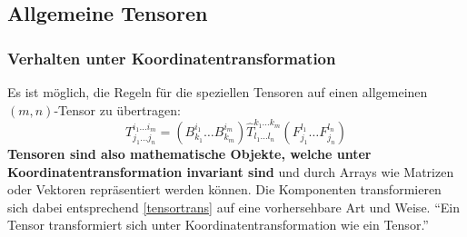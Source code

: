 	\subsection{Allgemeine Tensoren}
	\subsubsection{Verhalten unter Koordinatentransformation}
	Es ist möglich, die Regeln für die speziellen Tensoren auf einen allgemeinen $(m,n)$-Tensor zu übertragen:
	\begin{equation}\label{tensortrans}
		T^{i_1\dots i_m}_{j_1\dots j_n}=(B^{i_1}_{k_1}\dots B^{i_m}_{k_m})\hat{T}^{k_1\dots k_m}_{l_1\dots l_n}(F^{l_1}_{j_1}\dots F^{l_n}_{j_n})
	\end{equation}
	\textbf{Tensoren sind also mathematische Objekte, welche unter Koordinatentransformation invariant sind} und durch Arrays wie Matrizen oder Vektoren repräsentiert werden können. Die Komponenten transformieren sich dabei entsprechend \ref{tensortrans} auf eine vorhersehbare Art und Weise. \enquote{Ein Tensor transformiert sich unter Koordinatentransformation wie ein Tensor.}
